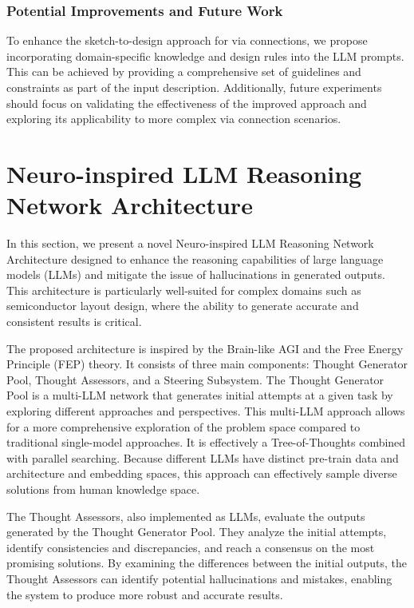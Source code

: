 \documentclass{article}
\begin{document}
\subsubsection{Potential Improvements and Future Work}
To enhance the sketch-to-design approach for via connections, we propose incorporating domain-specific knowledge and design rules into the LLM prompts. This can be achieved by providing a comprehensive set of guidelines and constraints as part of the input description. Additionally, future experiments should focus on validating the effectiveness of the improved approach and exploring its applicability to more complex via connection scenarios.

\section{Neuro-inspired LLM Reasoning Network Architecture}

In this section, we present a novel Neuro-inspired LLM Reasoning Network Architecture designed to enhance the reasoning capabilities of large language models (LLMs) and mitigate the issue of hallucinations in generated outputs. This architecture is particularly well-suited for complex domains such as semiconductor layout design, where the ability to generate accurate and consistent results is critical.

The proposed architecture is inspired by the Brain-like AGI and the Free Energy Principle (FEP) theory. It consists of three main components: Thought Generator Pool, Thought Assessors, and a Steering Subsystem. The Thought Generator Pool is a multi-LLM network that generates initial attempts at a given task by exploring different approaches and perspectives. This multi-LLM approach allows for a more comprehensive exploration of the problem space compared to traditional single-model approaches. It is effectively a Tree-of-Thoughts combined with parallel searching. Because different LLMs have distinct pre-train data and architecture and embedding spaces, this approach can effectively sample diverse solutions from human knowledge space.

The Thought Assessors, also implemented as LLMs, evaluate the outputs generated by the Thought Generator Pool. They analyze the initial attempts, identify consistencies and discrepancies, and reach a consensus on the most promising solutions. By examining the differences between the initial outputs, the Thought Assessors can identify potential hallucinations and mistakes, enabling the system to produce more robust and accurate results.
\end{document}
